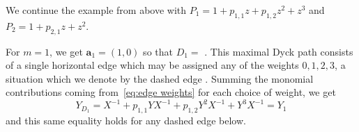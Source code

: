 \documentclass[ALCO,ThmDefs,Unicode,epreuves]{cedram}
\newcommand{\bfa}{\mathbf{a}}
\begin{document}
 \begin{example}
 We continue the example from above with $P_1=1+p_{1,1}z+p_{1,2}z^2+z^3$ and $P_2=1+p_{2,1}z+z^2$.
 
 For $m=1$, we get $\bfa_1=(1,0)$ so that $D_1=$ 
 .
 This maximal Dyck path consists of a single horizontal edge which may be assigned any of the weights $0,1,2,3$, a situation which we denote by the dashed edge
 .
 Summing the monomial contributions coming from~\eqref{eq:edge weights} for each choice of weight, we get
 \[Y_{D_1}=X^{-1}+p_{1,1}YX^{-1}+p_{1,2}Y^2X^{-1}+Y^3X^{-1}=Y_1\]
 and this same equality holds for any dashed edge below.


\end{example}
\end{document}
